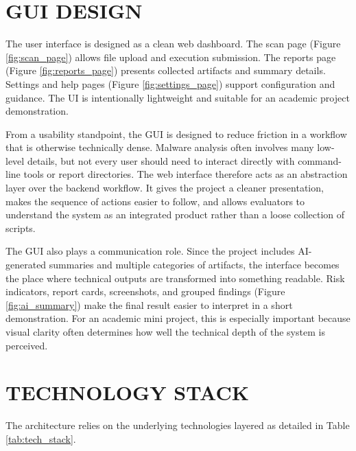 \documentclass[a4paper,12pt,oneside]{report}
\begin{document}
\section{GUI DESIGN}
The user interface is designed as a clean web dashboard. The scan page (Figure \ref{fig:scan_page}) allows file upload and execution submission. The reports page (Figure \ref{fig:reports_page}) presents collected artifacts and summary details. Settings and help pages (Figure \ref{fig:settings_page}) support configuration and guidance. The UI is intentionally lightweight and suitable for an academic project demonstration.

\par

\par

From a usability standpoint, the GUI is designed to reduce friction in a workflow that is otherwise technically dense. Malware analysis often involves many low-level details, but not every user should need to interact directly with command-line tools or report directories. The web interface therefore acts as an abstraction layer over the backend workflow. It gives the project a cleaner presentation, makes the sequence of actions easier to follow, and allows evaluators to understand the system as an integrated product rather than a loose collection of scripts.

\par

\par

The GUI also plays a communication role. Since the project includes AI-generated summaries and multiple categories of artifacts, the interface becomes the place where technical outputs are transformed into something readable. Risk indicators, report cards, screenshots, and grouped findings (Figure \ref{fig:ai_summary}) make the final result easier to interpret in a short demonstration. For an academic mini project, this is especially important because visual clarity often determines how well the technical depth of the system is perceived.
\section{TECHNOLOGY STACK}
The architecture relies on the underlying technologies layered as detailed in Table \ref{tab:tech_stack}.
\end{document}
